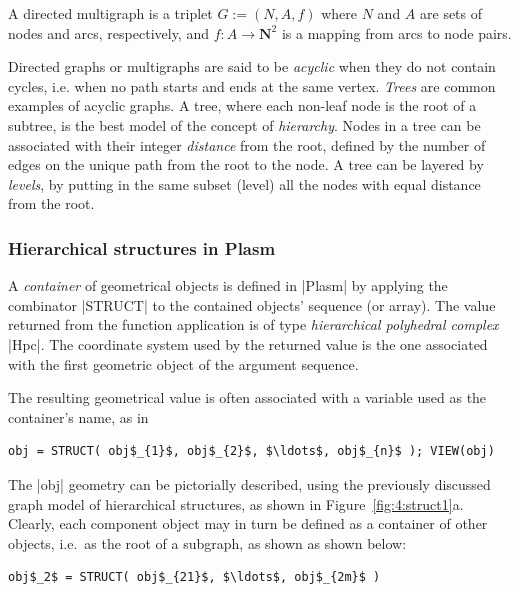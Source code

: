 \begin{coding}
\begin{definition} A directed multigraph is a
triplet $G := (N,A,f)$ where $N$ and $A$ are sets of nodes and arcs, respectively, and $f:
A \to \mathbf{N}^{2}$ is a mapping from arcs to node pairs.  
\end{definition}

Directed graphs or multigraphs are said to be \emph{acyclic} when they do not contain cycles, i.e. when no path starts and ends at the same vertex.  \emph{Trees} are common examples of acyclic graphs. A tree, where each non-leaf node is the root of a subtree, is the best model of the concept of \emph{hierarchy}. Nodes in a tree can be associated with their integer \emph{distance} from the root, defined by the number of edges on the unique path from the root to the node.  A tree can be layered by \emph{levels}, by putting in the same subset (level) all the nodes with equal distance from the root.

\subsubsection*{Hierarchical structures in Plasm}


A \emph{container} of geometrical objects is defined in |Plasm| by
applying the combinator |STRUCT| to the contained objects' sequence (or array).  The value returned from the function application is of type 
\emph{hierarchical polyhedral complex} |Hpc|.  The coordinate system used by
the returned value is the one associated with
the first geometric object of the argument sequence.  

The resulting geometrical value is often associated with a variable used as the container's name, as in
\begin{lstlisting}[language=JuliaLocal, style=julia, mathescape=true]
    obj = STRUCT( obj$_{1}$, obj$_{2}$, $\ldots$, obj$_{n}$ ); VIEW(obj)
\end{lstlisting}

The |obj| geometry can be pictorially described, using the
previously discussed graph model of hierarchical structures, as shown
in Figure~\ref{fig:4:struct1}a.  Clearly, each component object may in
turn be defined as a container of other objects, i.e.~as the root of a
subgraph, as shown as shown below:
\begin{lstlisting}[language=JuliaLocal, style=julia, mathescape=true]
    obj$_2$ = STRUCT( obj$_{21}$, $\ldots$, obj$_{2m}$ )
\end{lstlisting}



\end{coding}

